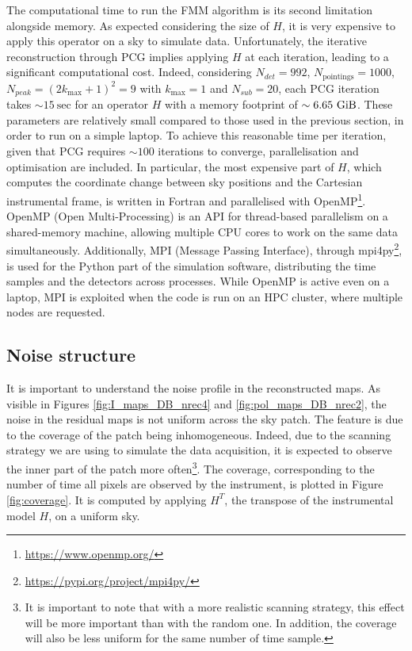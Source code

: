 \documentclass[../../thesis.tex]{subfiles}
\begin{document}
The computational time to run the FMM algorithm is its second limitation alongside memory. As expected considering the size of $H$, it is very expensive to apply this operator on a sky to simulate data. Unfortunately, the iterative reconstruction through PCG implies applying $H$ at each iteration, leading to a significant computational cost.
Indeed, considering $N_{det} = 992$, $N_{\text{pointings}} = 1000$, $N_{peak} = (2k_\text{max}+1)^2 = 9$ with $k_\text{max} = 1$ and $N_{sub} = 20$, each PCG iteration takes $\sim 15~\text{sec}$ for an operator $H$ with a memory footprint of $\sim 6.65~\text{\text{GiB}}$. These parameters are relatively small compared to those used in the previous section, in order to run on a simple laptop. To achieve this reasonable time per iteration, given that PCG requires $\sim 100$ iterations to converge, parallelisation and optimisation are included. In particular, the most expensive part of $H$, which computes the coordinate change between sky positions and the Cartesian instrumental frame, is written in Fortran and parallelised with OpenMP\footnote{\url{https://www.openmp.org/}}. OpenMP (Open Multi-Processing) is an API for thread-based parallelism on a shared-memory machine, allowing multiple CPU cores to work on the same data simultaneously.
Additionally, MPI (Message Passing Interface), through mpi4py\footnote{\url{https://pypi.org/project/mpi4py/}}, is used for the Python part of the simulation software, distributing the time samples and the detectors across processes. While OpenMP is active even on a laptop, MPI is exploited when the code is run on an HPC cluster, where multiple nodes are requested.

\subsection{Noise structure}

It is important to understand the noise profile in the reconstructed maps. As visible in Figures \ref{fig:I_maps_DB_nrec4} and \ref{fig:pol_maps_DB_nrec2}, the noise in the residual maps is not uniform across the sky patch. The feature is due to the coverage of the patch being inhomogeneous. 
Indeed, due to the scanning strategy we are using to simulate the data acquisition, it is expected to observe the inner part of the patch more often\footnote{It is important to note that with a more realistic scanning strategy, this effect will be more important than with the random one. In addition, the coverage will also be less uniform for the same number of time sample.}. The coverage, corresponding to the number of time all pixels are observed by the instrument, is plotted in Figure \ref{fig:coverage}. It is computed by applying $H^T$, the transpose of the instrumental model $H$, on a uniform sky.
\end{document}
